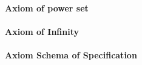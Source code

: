 




\paragraph{Axiom of power set}


\paragraph{Axiom of Infinity}



\paragraph{Axiom Schema of Specification}





